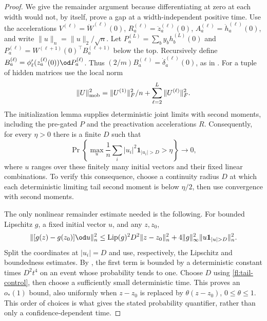 \begin{proof}
We give the remainder argument because differentiating at zero at each
width would not, by itself, prove a gap at a width-independent positive time.
Use the accelerations
$V^{(\ell)}=\ddot W^{(\ell)}(0)$,
$R_a^{(\ell)}=\ddot z_a^{(\ell)}(0)$,
$A_a^{(\ell)}=\ddot h_a^{(\ell)}(0)$, and write
$\|u\|_n=\|u\|_2/\sqrt n$.
Let $P_a^{(L)}=\sum_b y_bh_b^{(L)}(0)$ and
$P_a^{(\ell)}=W^{(\ell+1)}(0)^\top B_a^{(\ell+1)}$ below the top.
Recursively define
$B_a^{(\ell)}=\phi_\ell'(z_a^{(\ell)}(0))\od P_a^{(\ell)}$.
Thus $(2/m)B_a^{(\ell)}=\dot\delta_a^{(\ell)}(0)$, as in
.
For a tuple of hidden matrices use the local norm
\[
 \|U\|_{\rm mob}^2=\|U^{(1)}\|_F^2/n+
                       \sum_{\ell=2}^L\|U^{(\ell)}\|_F^2.
\]
The initialization lemma supplies deterministic joint limits with second
moments, including the pre-gated $P$ and the preactivation accelerations $R$.
Consequently, for every $\eta>0$ there is a finite $D$ such that
\begin{equation}
 \Pr\left\{\max_u\frac1n\sum_i |u_i|^2
                     \mathbf1_{|u_i|>D}>\eta\right\}\longrightarrow0,
 \label{fl:tail-control}
\end{equation}
where $u$ ranges over these finitely many initial vectors and their fixed
linear combinations. To verify this consequence, choose a continuity radius
$D$ at which each deterministic limiting tail second moment is below
$\eta/2$, then use convergence with second moments.

The only nonlinear remainder estimate needed is the following. For bounded
Lipschitz $g$, a fixed initial vector $u$, and any $z,z_0$,
\begin{equation}
 \|[g(z)-g(z_0)]\od u\|_n^2
 \le \operatorname{Lip}(g)^2D^2\|z-z_0\|_n^2
       +4\|g\|_\infty^2\|u\mathbf1_{|u|>D}\|_n^2.
 \label{fl:multiplier}
\end{equation}
Split the coordinates at $|u_i|=D$ and use, respectively, the Lipschitz
and boundedness estimates. By , the first term is
bounded by a deterministic constant times $D^2t^4$ on an event whose
probability tends to one. Choose $D$ using \eqref{fl:tail-control}, then
choose a sufficiently small deterministic time. This proves an $o_*(1)$
bound, also uniformly when $z-z_0$ is replaced by $\theta(z-z_0)$,
$0\le\theta\le1$. This order of choices is what gives the stated
probability quantifier, rather than only a confidence-dependent time.


\end{proof}
